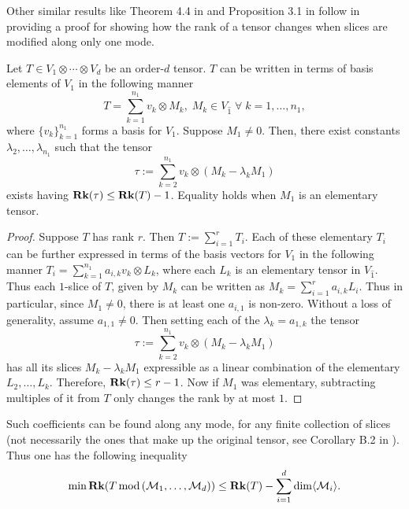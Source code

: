 \documentclass[../Lael_John_MasterThesis_Draft.tex]{subfiles}
\begin{document}
Other similar results like Theorem 4.4 in \cite{seigal_ranks_2020} and Proposition 3.1 in \cite{landsberg_abelian_2017} follow \cite{alexeev_tensor_2011} in providing a proof for showing how the rank of a tensor changes when slices are modified along only one mode.
\begin{lemma}\label{lemma:substitutionmethod}
    Let $T \in V_1 \otimes \cdots \otimes V_d$ be an order-$d$ tensor. $T$ can be written in terms of basis elements of $V_1$ in the following manner
    \begin{equation}
        T = \sum_{k=1}^{n_1} v_k \otimes M_k,\; M_k \in V_{\hat{1}}\;\forall\; k = 1, \ldots, n_1,
    \end{equation}
    where $\{v_k\}_{k=1}^{n_1}$ forms a basis for $V_1$. Suppose $M_1 \neq 0$. Then, there exist constants $\lambda_2, \ldots, \lambda_{n_1}$ such that the tensor
    \begin{equation}
        \tau := \sum_{k=2}^{n_1} v_k \otimes (M_k - \lambda_kM_1)
    \end{equation}
    exists having $\textbf{Rk}(\tau) \leq \textbf{Rk}(T) - 1$. Equality holds when $M_1$ is an elementary tensor.
\end{lemma}
\begin{proof}
    Suppose $T$ has rank $r$. Then $T := \sum_{i=1}^{r} T_i$. Each of these elementary $T_i$ can be further expressed in terms of the basis vectors for $V_1$ in the following manner $T_i = \sum_{k=1}^{n_1} a_{i,k}v_k \otimes L_k$, where each $L_k$ is an elementary tensor in $V_{\hat{1}}$. Thus each $1$-slice of $T$, given by $M_k$ can be written as $M_k = \sum_{i=1}^{r} a_{i,k}L_i$. Thus in particular, since $M_1 \neq 0$, there is at least one $a_{i, 1}$ is non-zero. Without a loss of generality, assume $a_{1,1} \neq 0$. Then setting each of the $\lambda_k = a_{1, k}$ the tensor $$\tau := \sum_{k=2}^{n_1} v_k \otimes (M_k - \lambda_kM_1)$$ has all its slices $M_k - \lambda_kM_1$ expressible as a linear combination of the elementary $L_2, \ldots, L_k$. Therefore, $\textbf{Rk}(\tau) \leq r - 1$. Now if $M_1$ was elementary, subtracting multiples of it from $T$ only changes the rank by at most $1$. 
\end{proof}
Such coefficients can be found along any mode, for any finite collection of slices (not necessarily the ones that make up the original tensor, see Corollary B.2 in \cite{alexeev_tensor_2011}). Thus one has the following inequality 
\begin{equation}\label{eqn:rankineqpostmodulo}
    \min \textbf{Rk}(T\text{\,mod\,}(\mathcal{M}_1, \ldots, \mathcal{M}_d)) \leq \textbf{Rk}(T) - \sum_{i=1}^{d} \dim \langle \mathcal{M}_i \rangle.
\end{equation}
\end{document}
